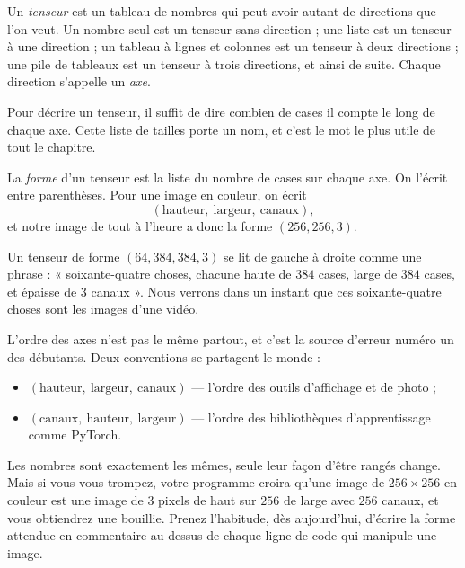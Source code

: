\begin{definition}[Le tenseur][tenseur]
Un \emph{tenseur} est un tableau de nombres qui peut avoir autant de
directions que l'on veut. Un nombre seul est un tenseur sans direction ;
une liste est un tenseur à une direction ; un tableau à lignes et colonnes
est un tenseur à deux directions ; une pile de tableaux est un tenseur à
trois directions, et ainsi de suite. Chaque direction s'appelle un
\emph{axe}.
\end{definition}

Pour décrire un tenseur, il suffit de dire combien de cases il compte le
long de chaque axe. Cette liste de tailles porte un nom, et c'est le mot le
plus utile de tout le chapitre.

\begin{notation}
La \emph{forme} d'un tenseur est la liste du nombre de cases sur chaque
axe. On l'écrit entre parenthèses. Pour une image en couleur, on écrit
\[
  (\text{hauteur},\ \text{largeur},\ \text{canaux}),
\]
et notre image de tout à l'heure a donc la forme $(256, 256, 3)$.
\end{notation}

\begin{exemple}
Un tenseur de forme $(64, 384, 384, 3)$ se lit de gauche à droite comme une
phrase : « soixante-quatre choses, chacune haute de $384$ cases, large de
$384$ cases, et épaisse de $3$ canaux ». Nous verrons dans un instant que
ces soixante-quatre choses sont les images d'une vidéo.
\end{exemple}

\begin{piege}
L'ordre des axes n'est pas le même partout, et c'est la source d'erreur
numéro un des débutants. Deux conventions se partagent le monde :

\begin{itemize}
  \item $(\text{hauteur},\ \text{largeur},\ \text{canaux})$ — l'ordre des
        outils d'affichage et de photo ;
  \item $(\text{canaux},\ \text{hauteur},\ \text{largeur})$ — l'ordre des
        bibliothèques d'apprentissage comme PyTorch.
\end{itemize}

Les nombres sont exactement les mêmes, seule leur façon d'être rangés
change. Mais si vous vous trompez, votre programme croira qu'une image de
$256 \times 256$ en couleur est une image de $3$ pixels de haut sur $256$ de
large avec $256$ canaux, et vous obtiendrez une bouillie. Prenez
l'habitude, dès aujourd'hui, d'écrire la forme attendue en commentaire
au-dessus de chaque ligne de code qui manipule une image.
\end{piege}

